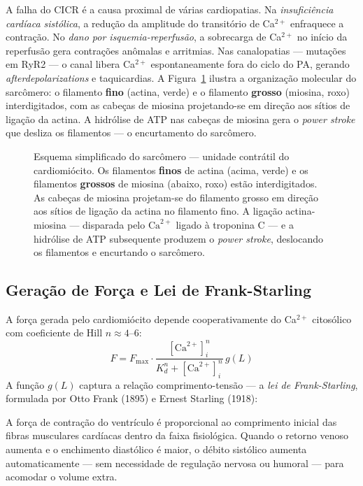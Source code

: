 A falha do CICR é a causa proximal de várias cardiopatias. Na
\emph{insuficiência cardíaca sistólica}, a redução da amplitude do
transitório de Ca$^{2+}$ enfraquece a contração. No \emph{dano por
isquemia-reperfusão}, a sobrecarga de Ca$^{2+}$ no início da reperfusão
gera contrações anômalas e arritmias. Nas canalopatias --- mutações em
RyR2 --- o canal libera Ca$^{2+}$ espontaneamente fora do ciclo do PA,
gerando \emph{afterdepolarizations} e taquicardias. A
Figura~\ref{fig:12-sarcomero} ilustra a organização molecular do
sarcômero: o filamento \textbf{fino} (actina, verde) e o filamento
\textbf{grosso} (miosina, roxo) interdigitados, com as cabeças de
miosina projetando-se em direção aos sítios de ligação da actina. A
hidrólise de ATP nas cabeças de miosina gera o \emph{power stroke}
que desliza os filamentos --- o encurtamento do sarcômero.

\begin{figure}[htbp]
\centering
{}
\caption{Esquema simplificado do sarcômero --- unidade contrátil do cardiomiócito. Os filamentos \textbf{finos} de actina (acima, verde) e os filamentos \textbf{grossos} de miosina (abaixo, roxo) estão interdigitados. As cabeças de miosina projetam-se do filamento grosso em direção aos sítios de ligação da actina no filamento fino. A ligação actina-miosina --- disparada pelo $\mathrm{Ca}^{2+}$ ligado à troponina C --- e a hidrólise de ATP subsequente produzem o \emph{power stroke}, deslocando os filamentos e encurtando o sarcômero.}
\label{fig:12-sarcomero}
\end{figure}

\subsection{Geração de Força e Lei de Frank-Starling}
\label{sub:image12-frank-starling}

A força gerada pelo cardiomiócito depende cooperativamente do Ca$^{2+}$
citosólico com coeficiente de Hill $n \approx 4$--$6$:
\begin{equation}
F = F_{\max} \cdot \frac{[\mathrm{Ca}^{2+}]_i^n}{K_d^n + [\mathrm{Ca}^{2+}]_i^n}\, g(L)
\end{equation}
A função $g(L)$ captura a relação comprimento-tensão --- a \emph{lei de
Frank-Starling}, formulada por Otto Frank (1895) e Ernest Starling (1918):
\begin{exemploenumv}
A força de contração do ventrículo é proporcional ao comprimento inicial
das fibras musculares cardíacas dentro da faixa fisiológica. Quando o
retorno venoso aumenta e o enchimento diastólico é maior, o débito
sistólico aumenta automaticamente --- sem necessidade de regulação
nervosa ou humoral --- para acomodar o volume extra.
\end{exemploenumv}


